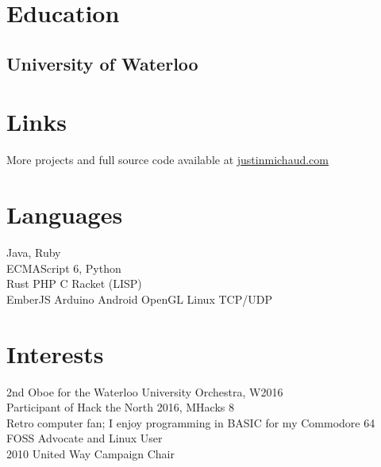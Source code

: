 \documentclass[]{deedy-resume-openfont}
\begin{document}
%
%

%
%

\begin{minipage}[t]{0.31\textwidth} 


\section{Education} 

\subsection{University of Waterloo}
\sectionsep

\section{Links}
More projects and full source code available at \href{http://justinmichaud.com}{justinmichaud.com}



\section{Languages}
Java, Ruby\\
ECMAScript 6, Python\\
Rust \textbullet{} PHP \textbullet{} C \textbullet{} Racket (LISP) \\
EmberJS \textbullet{} Arduino \textbullet{} Android \textbullet{} OpenGL \textbullet{} Linux \textbullet{} TCP/UDP\\

\section{Interests}
\textbullet{} 2nd Oboe for the Waterloo University Orchestra, W2016\\
\textbullet{} Participant of Hack the North 2016, MHacks 8\\
\textbullet{} Retro computer fan; I enjoy programming in BASIC for my Commodore 64\\
\textbullet{} FOSS Advocate and Linux User\\
\textbullet{} 2010 United Way Campaign Chair


\end{minipage}
\end{document}

